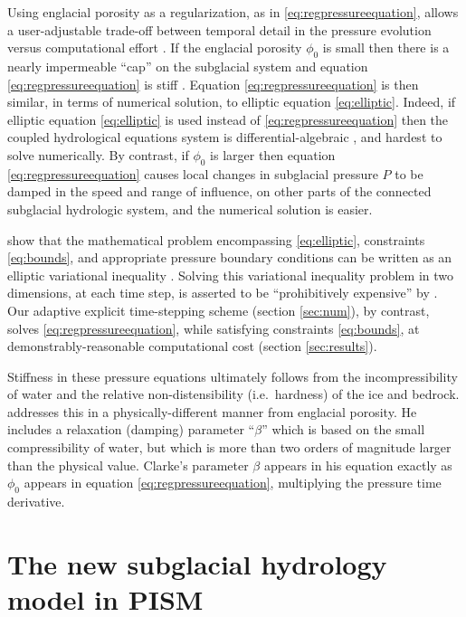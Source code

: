 \documentclass[gmd]{copernicus}   %
\begin{document}
Using englacial porosity as a regularization, as in \eqref{eq:regpressureequation}, allows a user-adjustable trade-off between temporal detail in the pressure evolution versus computational effort \citep{vanPeltthesis}.  If the englacial porosity $\phi_0$ is small then there is a nearly impermeable ``cap'' on the subglacial system and equation \eqref{eq:regpressureequation} is stiff \citep{AscherPetzold}.  Equation \eqref{eq:regpressureequation} is then similar, in terms of numerical solution, to elliptic equation \eqref{eq:elliptic}.  Indeed, if elliptic equation \eqref{eq:elliptic} is used instead of \eqref{eq:regpressureequation} then the coupled hydrological equations system is differential-algebraic \citep{AscherPetzold}, and hardest to solve numerically.  By contrast, if $\phi_0$ is larger then equation \eqref{eq:regpressureequation} causes local changes in subglacial pressure $P$ to be damped in the speed and range of influence, on other parts of the connected subglacial hydrologic system, and the numerical solution is easier.

\cite{Schoofetal2012} show that the mathematical problem encompassing \eqref{eq:elliptic}, constraints \eqref{eq:bounds}, and appropriate pressure boundary conditions can be written as an elliptic variational inequality \citep{KinderlehrerStampacchia}.  Solving this variational inequality problem in two dimensions, at each time step, is asserted to be ``prohibitively expensive'' by \cite{Werderetal2013}.  Our adaptive explicit time-stepping scheme (section \ref{sec:num}), by contrast, solves \eqref{eq:regpressureequation}, while satisfying constraints \eqref{eq:bounds}, at demonstrably-reasonable computational cost (section \ref{sec:results}).

Stiffness in these pressure equations ultimately follows from the incompressibility of water and the relative non-distensibility (i.e.~hardness) of the ice and bedrock.  \cite{Clarke2003} addresses this in a physically-different manner from englacial porosity.  He includes a relaxation (damping) parameter  ``$\beta$'' which is based on the small compressibility of water, but which is more than two orders of magnitude larger than the physical value.  Clarke's parameter $\beta$ appears in his equation exactly as $\phi_0$ appears in equation \eqref{eq:regpressureequation}, multiplying the pressure time derivative.


\section{The new subglacial hydrology model in PISM} \label{sec:newmodel}
\end{document}
